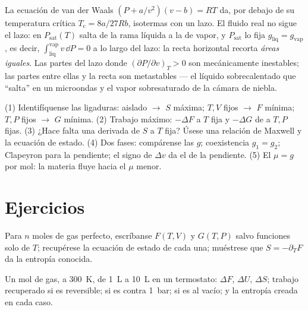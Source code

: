 \begin{remark}\label{rem:b2:thermodynamic-potentials:maxwellconstruction}
La ecuación de van der Waals $(P + a/v^2)(v - b) = RT$ da, por debajo de su
temperatura crítica $T_{\text{c}} = 8a/27Rb$, isotermas con un lazo. El
fluido real no sigue el lazo: en $P_{\text{sat}}(T)$ salta de
la rama líquida a la de vapor, y $P_{\text{sat}}$ lo fija $g_{\text{liq}}
= g_{\text{vap}}$, es decir, $\int_{\text{liq}}^{\text{vap}}v\,\dd P = 0$ a lo largo del
lazo: la recta horizontal recorta \emph{áreas iguales}. Las partes del
lazo donde $(\partial P/\partial v)_T > 0$ son mecánicamente inestables; las
partes entre ellas y la recta son metastables --- el líquido sobrecalentado
que ``salta'' en un microondas y el vapor sobresaturado de la
cámara de niebla.
\end{remark}

\begin{method}\label{meth:b2:thermodynamic-potentials:method}
(1) Identifíquense las ligaduras: aislado $\to$ $S$ máxima; $T,V$ fijos $\to$
$F$ mínima; $T,P$ fijos $\to$ $G$ mínima. (2) Trabajo máximo: $-\Delta F$ a $T$
fija y $-\Delta G$ de  a $T,P$ fijas. (3) ¿Hace falta una derivada de
$S$ a $T$ fija? Úsese una relación de Maxwell y la ecuación de estado.
(4) Dos fases: compárense las $g$; coexistencia $g_1 = g_2$; Clapeyron para la
pendiente; el signo de $\Delta v$ da el de la pendiente. (5) El  $\mu = g$ por mol: la materia fluye hacia el $\mu$ menor.
\end{method}

\section{Ejercicios}

\begin{exercise}[$\star$]\label{exo:b2:thermodynamic-potentials:1}
Para $n$ moles de gas perfecto, escríbanse $F(T,V)$ y $G(T,P)$ salvo
funciones solo de $T$; recupérese la ecuación de estado de cada una; muéstrese
que $S = -\partial_TF$ da la entropía conocida.
\end{exercise}

\begin{exercise}[$\star$]\label{exo:b2:thermodynamic-potentials:2}
Un mol de gas, a \qty{300}{K}, de \qty{1}{L} a \qty{10}{L} en un
termostato: $\Delta F$, $\Delta U$, $\Delta S$; trabajo recuperado si es reversible;
si es contra \qty{1}{bar}; si es al vacío; y la entropía creada en cada
caso.
\end{exercise}

